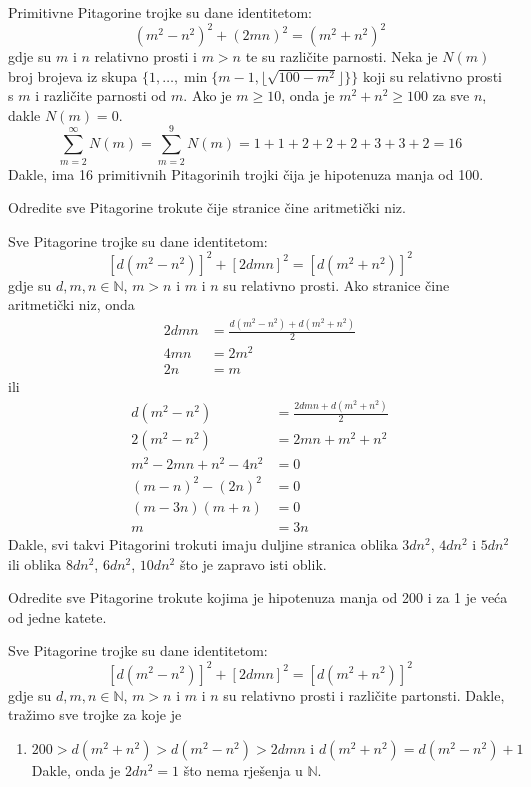 \documentclass{exam}
\begin{document}
\begin{questions}
\begin{solution}
  Primitivne Pitagorine trojke su dane identitetom:
  \[
    (m^2-n^2)^2 + (2mn)^2 = (m^2+n^2)^2
  \]
  gdje su $m$ i $n$ relativno prosti i $m > n$ te su različite parnosti. Neka je $N(m)$ broj brojeva iz skupa $\{1, \dots, \min\{m - 1, \lfloor \sqrt{100 - m^2} \rfloor \}\}$ koji su relativno prosti s $m$ i različite parnosti od $m$. Ako je $m \geq 10$, onda je $m^2 + n^2 \geq 100$ za sve $n$, dakle $N(m) = 0$.
  \[
    \sum_{m = 2}^{\infty} N(m) = \sum_{m = 2}^{9} N(m) = 1 + 1 + 2 + 2 + 2 + 3 + 3 + 2 = 16
  \]
  Dakle, ima 16 primitivnih Pitagorinih trojki čija je hipotenuza manja od 100.
\end{solution}

\question Odredite sve Pitagorine trokute čije stranice čine aritmetički niz.

\begin{solution}
  Sve Pitagorine trojke su dane identitetom:
  \[
    [d(m^2-n^2)]^2 + [2dmn]^2 = [d(m^2+n^2)]^2
  \]
  gdje su $d, m, n \in \mathbb{N}$, $m > n$ i $m$ i $n$ su relativno prosti. Ako stranice čine aritmetički niz, onda
  \begin{align*}
    2dmn &= \frac{d(m^2-n^2) + d(m^2+n^2)}{2}\\
    4mn &= 2m^2\\
    2n &= m
  \end{align*}
  ili
  \begin{align*}
    d(m^2-n^2) &= \frac{2dmn + d(m^2+n^2)}{2}\\
    2(m^2-n^2) &= 2mn + m^2 + n^2\\
    m^2 - 2mn + n^2 - 4n^2 &= 0\\
    (m - n)^2 - (2n)^2 &= 0\\
    (m - 3n)(m + n) &= 0\\
    m &= 3n
  \end{align*}
  Dakle, svi takvi Pitagorini trokuti imaju duljine stranica oblika $3dn^2$, $4dn^2$ i $5dn^2$ ili oblika $8dn^2$, $6dn^2$, $10dn^2$ što je zapravo isti oblik.
\end{solution}

\question Odredite sve Pitagorine trokute kojima je hipotenuza manja od 200 i za 1 je veća od jedne katete.

\begin{solution}
  Sve Pitagorine trojke su dane identitetom:
  \[
    [d(m^2-n^2)]^2 + [2dmn]^2 = [d(m^2+n^2)]^2
  \]
  gdje su $d, m, n \in \mathbb{N}$, $m > n$ i $m$ i $n$ su relativno prosti i različite partonsti. Dakle, tražimo sve trojke za koje je
  \begin{enumerate}
    \item
      \[
        200 > d(m^2+n^2) > d(m^2-n^2) > 2dmn \text{ i } d(m^2+n^2) = d(m^2-n^2) + 1
      \]
      Dakle, onda je $2dn^2 = 1$ što nema rješenja u $\mathbb{N}$.


\end{enumerate}
\end{solution}
\end{questions}
\end{document}

